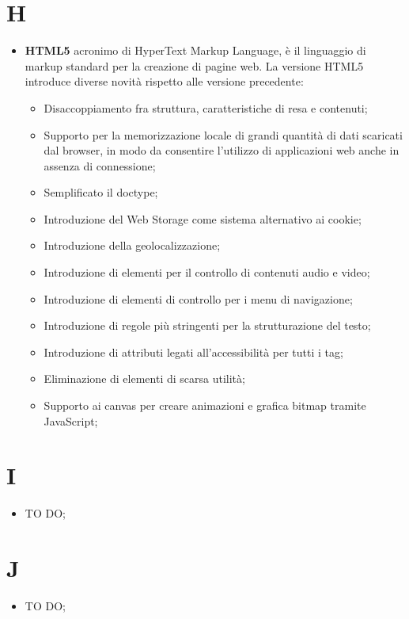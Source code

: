 \section*{H} %
\label{sec:h}
	\begin{itemize}
		\item \textbf{HTML5} acronimo di HyperText Markup Language, è il linguaggio di markup standard per la creazione di pagine web. La versione HTML5 introduce diverse novità rispetto alle versione precedente:
		 \begin{itemize}
		 	\item Disaccoppiamento fra struttura, caratteristiche di resa e contenuti;
		 	\item Supporto per la memorizzazione locale di grandi quantità di dati scaricati dal browser, in modo da consentire l'utilizzo di applicazioni web anche in assenza di connessione;
		 	\item Semplificato il doctype;
		 	\item Introduzione del Web Storage come sistema alternativo ai cookie;
		 	\item Introduzione della geolocalizzazione;
			\item Introduzione di elementi per il controllo di contenuti audio e video;
			\item Introduzione di elementi di controllo per i menu di navigazione;
			\item Introduzione di regole più stringenti per la strutturazione del testo;
			\item Introduzione di attributi legati all'accessibilità per tutti i tag;
			\item Eliminazione di elementi di scarsa utilità;
			\item Supporto ai canvas per creare animazioni e grafica bitmap tramite JavaScript;
		 \end{itemize}
	\end{itemize}
\pagebreak

\section*{I} %
\label{sec:i}
	\begin{itemize}
		\item TO DO;
	\end{itemize}
\pagebreak

\section*{J} %
\label{sec:j}
	\begin{itemize}
		\item TO DO;
	\end{itemize}
\pagebreak
